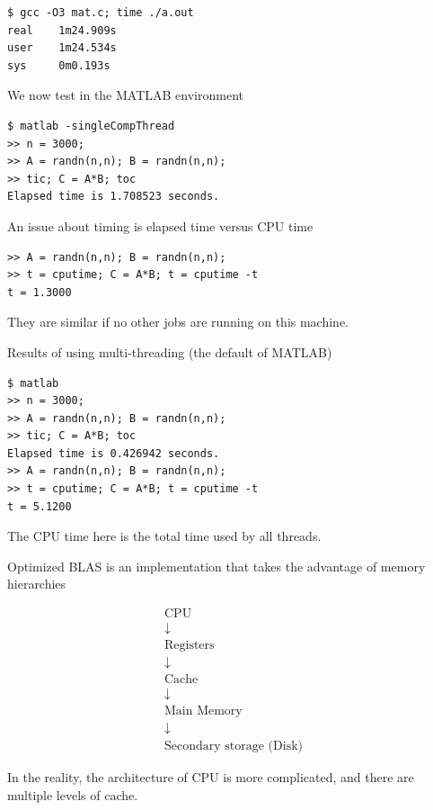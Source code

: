 \begin{verbatim}
$ gcc -O3 mat.c; time ./a.out
real    1m24.909s
user    1m24.534s
sys     0m0.193s
\end{verbatim}

We now test in the MATLAB environment
\begin{verbatim}
$ matlab -singleCompThread
>> n = 3000;
>> A = randn(n,n); B = randn(n,n);
>> tic; C = A*B; toc
Elapsed time is 1.708523 seconds.
\end{verbatim}

An issue about timing is elapsed time versus CPU time
\begin{verbatim}
>> A = randn(n,n); B = randn(n,n);
>> t = cputime; C = A*B; t = cputime -t
t = 1.3000
\end{verbatim}
They are similar if no other jobs are running on this machine.

Results of using multi-threading (the default of MATLAB) 
\begin{verbatim}
$ matlab
>> n = 3000;
>> A = randn(n,n); B = randn(n,n);
>> tic; C = A*B; toc
Elapsed time is 0.426942 seconds.
>> A = randn(n,n); B = randn(n,n);
>> t = cputime; C = A*B; t = cputime -t
t = 5.1200
\end{verbatim}
The CPU time here is the total time used by all threads.

Optimized BLAS is an implementation that takes the advantage of memory hierarchies

\begin{gather*}
\boxed{\mbox{CPU}} \\
\downarrow \\
\boxed{\mbox{Registers}} \\
  \downarrow \\
\boxed{\mbox{Cache}} \\
  \downarrow \\
\boxed{\mbox{Main Memory}} \\
  \downarrow \\
\boxed{\mbox{Secondary storage (Disk)}} 
\end{gather*}

\begin{note}
    In the reality, the architecture of CPU is more complicated, and there are multiple levels of cache.
\end{note}

